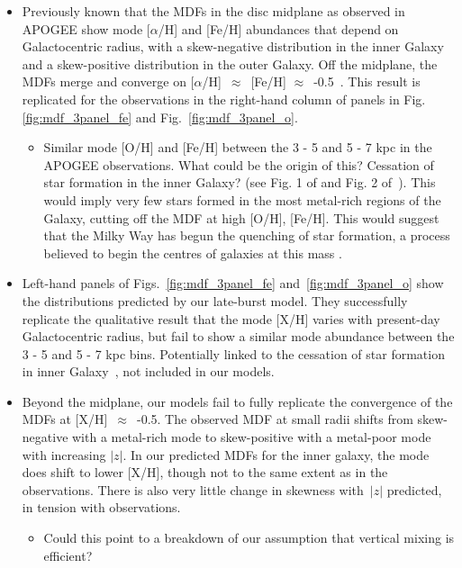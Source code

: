 \documentclass[fleqn, usenatbib]{mnras}
\begin{document}
\begin{itemize} 
	\item Previously known that the MDFs in the disc midplane as observed in 
	APOGEE show mode [$\alpha$/H] and [Fe/H] abundances that depend on 
	Galactocentric radius, with a skew-negative distribution in the inner 
	Galaxy and a skew-positive distribution in the outer Galaxy. Off the 
	midplane, the MDFs merge and converge on [$\alpha$/H]~$\approx$~[Fe/H] 
	$\approx$~-0.5~\citep{Hayden2015, Weinberg2019}. This result is 
	replicated for the observations in the right-hand column of panels in Fig. 
	\ref{fig:mdf_3panel_fe} and Fig.~\ref{fig:mdf_3panel_o}. 
	\begin{itemize} 
		\item Similar mode [O/H] and [Fe/H] between the 3 - 5 and 5 - 7 kpc 
		in the APOGEE observations. What could be the origin of this? 
		Cessation of star formation in the inner Galaxy? (see Fig. 1 of 
		\citealp{Peek2009} and Fig. 2 of~\citealp{Fraternali2012}). This 
		would imply very few stars formed in the most metal-rich regions of 
		the Galaxy, cutting off the MDF at high [O/H], [Fe/H]. This would 
		suggest that the Milky Way has begun the quenching of star formation, 
		a process believed to begin the centres of galaxies at this mass 
		\citep[e.g.][]{Ellison2020a}. 
	\end{itemize} 

	\item Left-hand panels of Figs.~\ref{fig:mdf_3panel_fe} 
	and~\ref{fig:mdf_3panel_o} show the distributions predicted by our 
	late-burst model. They successfully replicate the qualitative result that 
	the mode [X/H] varies with present-day Galactocentric radius, but fail to 
	show a similar mode abundance between the 3 - 5 and 5 - 7 kpc bins. 
	Potentially linked to the cessation of star formation in inner 
	Galaxy~\citep{Peek2009, Fraternali2012}, not included in our models. 

	\item Beyond the midplane, our models fail to fully replicate the 
	convergence of the MDFs at [X/H]~$\approx$~-0.5. The observed MDF at 
	small radii shifts from skew-negative with a metal-rich mode to 
	skew-positive with a metal-poor mode with increasing $\left|z\right|$. In 
	our predicted MDFs for the inner galaxy, the mode does shift to lower 
	[X/H], though not to the same extent as in the observations. There is also 
	very little change in skewness with~$\left|z\right|$ predicted, in tension 
	with observations. 
	\begin{itemize} 
		\item Could this point to a breakdown of our assumption that vertical 
		mixing is efficient? 
	\end{itemize} 


\end{itemize}
\end{document}
